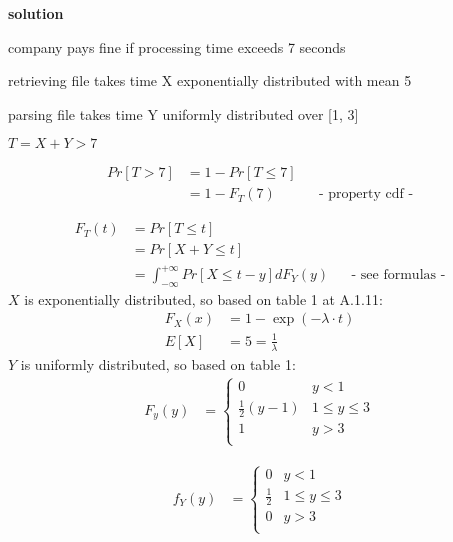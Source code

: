 \textbf{solution}

company pays fine if processing time exceeds 7 seconds

retrieving file takes time X exponentially distributed with mean 5

parsing file takes time Y uniformly distributed over [1, 3]

$T=X+Y> 7$

\begin{align*}
Pr\left[T> 7\right]&=1-Pr\left[T\le 7\right]\\
&=1-F_{T}\left(7\right)&& \text{-  property cdf -}
\end{align*}

\begin{align*}
F_{T}\left(t\right)&=Pr\left[T\le t\right]\\
&=Pr\left[X+Y\le t\right]\\
&=\int _{{-\infty }}^{{+\infty }}Pr\left[X\le t-y\right]dF_{Y}\left(y\right)&& \text{- see formulas -}
\end{align*}
$X$ is exponentially distributed, so based on table 1 at A.1.11:
\begin{align*}
F_{X}\left(x\right)&=1-\exp \left(-\lambda \cdot t\right)\\
E\left[X\right]&=5=\frac{1}{\lambda }
\end{align*}
$Y$ is uniformly distributed, so based on table 1:
\begin{align*}
F_{y}\left(y\right)&=\begin{cases}
0&y< 1\\
\frac{1}{2}\left(y-1\right)&1\le y\le 3\\
1&y> 3\\
\end{cases}
\end{align*}

\begin{align*}
f_{Y}\left(y\right)&=\begin{cases}
0&y< 1\\
\frac{1}{2}&1\le y\le 3\\
0&y> 3\\
\end{cases}
\end{align*}


